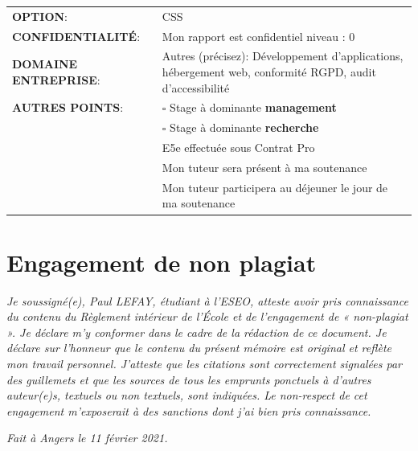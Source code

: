 \documentclass[12pt]{article}
\begin{document}
\begin{center}
	\begin{tabular}{ m{5cm} m{11.5cm} }
	\textbf{OPTION}: &  \mbox{\ooalign{$\checkmark$\cr\hidewidth$\square$\hidewidth\cr}} CSS  \\
    \textbf{CONFIDENTIALITÉ}:  & Mon rapport est confidentiel niveau : \mbox{\ooalign{$\checkmark$\cr\hidewidth$\square$\hidewidth\cr}} 0 \\
    \textbf{DOMAINE ENTREPRISE}: & \mbox{\ooalign{$\checkmark$\cr\hidewidth$\square$\hidewidth\cr}} Autres (précisez): Développement d'applications, hébergement web, conformité RGPD, audit d'accessibilité \\
    \textbf{AUTRES POINTS}: &  $\square$ Stage à dominante \textbf{management} \\
                             &  $\square$ Stage à dominante \textbf{recherche} \\
                             & \mbox{\ooalign{$\checkmark$\cr\hidewidth$\square$\hidewidth\cr}} E5e effectuée sous Contrat Pro \\
                             &  \mbox{\ooalign{$\checkmark$\cr\hidewidth$\square$\hidewidth\cr}} Mon tuteur sera présent à ma soutenance \\
                             &  \mbox{\ooalign{$\checkmark$\cr\hidewidth$\square$\hidewidth\cr}} Mon tuteur participera au déjeuner le jour de ma soutenance \\
\end{tabular}
\end{center}

\newpage

\section*{Engagement de non plagiat}
\textit{Je soussigné(e), Paul LEFAY, étudiant à l'\gls{ESEO}, atteste avoir pris connaissance du contenu du Règlement intérieur de l'École et de l'engagement de « non-plagiat ». 
Je déclare m'y conformer dans le cadre de la rédaction de ce document. 
Je déclare sur l'honneur que le contenu du présent mémoire est original et reflète mon travail personnel. 
J'atteste que les citations sont correctement signalées par des guillemets et que les sources de tous les emprunts ponctuels à d'autres auteur(e)s, textuels ou non textuels, sont indiquées. 
Le non-respect de cet engagement m'exposerait à des sanctions dont j'ai bien pris connaissance.}

\textit{Fait à Angers le 11 février 2021.}
\end{document}
